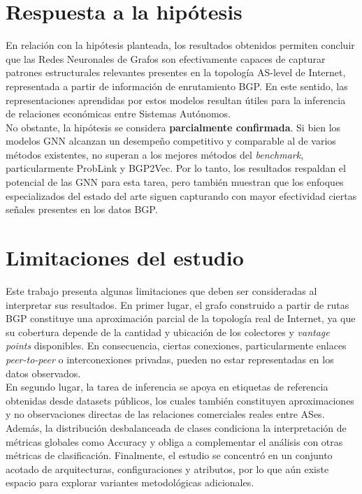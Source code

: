 \section{Respuesta a la hipótesis}

En relación con la hipótesis planteada, los resultados obtenidos permiten concluir que las Redes Neuronales de Grafos son efectivamente capaces de capturar patrones estructurales relevantes presentes en la topología AS-level de Internet, representada a partir de información de enrutamiento BGP. En este sentido, las representaciones aprendidas por estos modelos resultan útiles para la inferencia de relaciones económicas entre Sistemas Autónomos.\\

No obstante, la hipótesis se considera \textbf{parcialmente confirmada}. Si bien los modelos GNN alcanzan un desempeño competitivo y comparable al de varios métodos existentes, no superan a los mejores métodos del \textit{benchmark}, particularmente ProbLink y BGP2Vec. Por lo tanto, los resultados respaldan el potencial de las GNN para esta tarea, pero también muestran que los enfoques especializados del estado del arte siguen capturando con mayor efectividad ciertas señales presentes en los datos BGP.\\

\section{Limitaciones del estudio}

Este trabajo presenta algunas limitaciones que deben ser consideradas al interpretar sus resultados. En primer lugar, el grafo construido a partir de rutas BGP constituye una aproximación parcial de la topología real de Internet, ya que su cobertura depende de la cantidad y ubicación de los colectores y \textit{vantage points} disponibles. En consecuencia, ciertas conexiones, particularmente enlaces \textit{peer-to-peer} o interconexiones privadas, pueden no estar representadas en los datos observados.\\

En segundo lugar, la tarea de inferencia se apoya en etiquetas de referencia obtenidas desde datasets públicos, los cuales también constituyen aproximaciones y no observaciones directas de las relaciones comerciales reales entre ASes. Además, la distribución desbalanceada de clases condiciona la interpretación de métricas globales como Accuracy y obliga a complementar el análisis con otras métricas de clasificación. Finalmente, el estudio se concentró en un conjunto acotado de arquitecturas, configuraciones y atributos, por lo que aún existe espacio para explorar variantes metodológicas adicionales.\\

